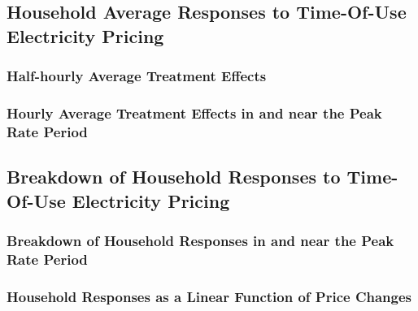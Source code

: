 \subsection{Household Average Responses to Time-Of-Use Electricity Pricing}
\label{Subsection:Household-Average-Responses-to-Time-Of-Use-Electricity-Pricing}

\subsubsection{Half-hourly Average Treatment Effects}
\label{Sub-subsection:Half-hourly-Average-Treatment-Effects}


\subsubsection{Hourly Average Treatment Effects in and near the Peak Rate Period}
\label{Sub-subsection:Hourly-Average-Treatment-Effects-in-and-near-the-Peak-Rate-Period}



\subsection{Breakdown of Household Responses to Time-Of-Use Electricity Pricing}
\label{Subsection:Breakdown-of-Responses-to-Time-Of-Use-Electricity-Pricing}

\subsubsection{Breakdown of Household Responses in and near the Peak Rate Period}
\label{Sub-subsection:Breakdown-of-Household-Responses-in-and-near-the-Peak-Rate-Period}


\subsubsection{Household Responses as a Linear Function of Price Changes}
\label{Sub-subsection:Household-Responses-as-a-Linear-Function-of-Price-Changes}



